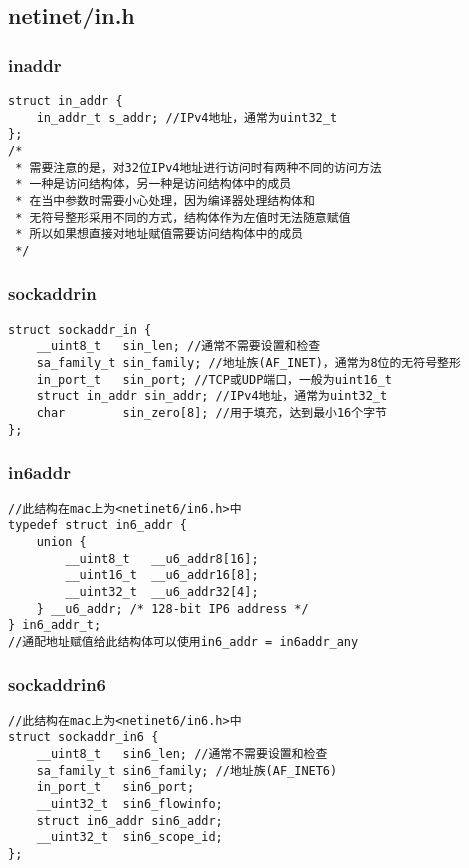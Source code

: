 \subsection{netinet/in.h}
\subsubsection{in\li addr}
\begin{verbatim}
struct in_addr {
    in_addr_t s_addr; //IPv4地址，通常为uint32_t
};
/*
 * 需要注意的是，对32位IPv4地址进行访问时有两种不同的访问方法
 * 一种是访问结构体，另一种是访问结构体中的成员
 * 在当中参数时需要小心处理，因为编译器处理结构体和
 * 无符号整形采用不同的方式，结构体作为左值时无法随意赋值
 * 所以如果想直接对地址赋值需要访问结构体中的成员
 */
\end{verbatim}

\subsubsection{sockaddr\li in}
\begin{verbatim}
struct sockaddr_in {
    __uint8_t   sin_len; //通常不需要设置和检查
    sa_family_t sin_family; //地址族(AF_INET)，通常为8位的无符号整形
    in_port_t   sin_port; //TCP或UDP端口，一般为uint16_t
    struct in_addr sin_addr; //IPv4地址，通常为uint32_t
    char        sin_zero[8]; //用于填充，达到最小16个字节
};
\end{verbatim}

\subsubsection{in6\li addr}
\begin{verbatim}
//此结构在mac上为<netinet6/in6.h>中
typedef struct in6_addr {
    union {
        __uint8_t   __u6_addr8[16];
        __uint16_t  __u6_addr16[8];
        __uint32_t  __u6_addr32[4];
    } __u6_addr; /* 128-bit IP6 address */
} in6_addr_t;
//通配地址赋值给此结构体可以使用in6_addr = in6addr_any
\end{verbatim}

\subsubsection{sockaddr\li in6}
\begin{verbatim}
//此结构在mac上为<netinet6/in6.h>中
struct sockaddr_in6 {
    __uint8_t   sin6_len; //通常不需要设置和检查
    sa_family_t sin6_family; //地址族(AF_INET6)
    in_port_t   sin6_port;
    __uint32_t  sin6_flowinfo;
    struct in6_addr	sin6_addr;
    __uint32_t  sin6_scope_id;
};
\end{verbatim}

